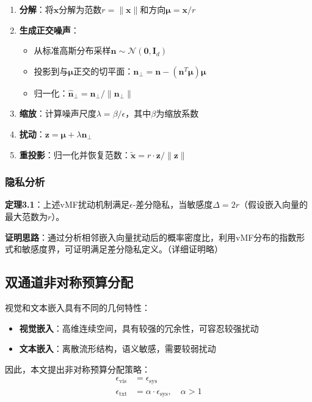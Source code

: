 \documentclass[a4paper,12pt]{article}
\begin{document}
\begin{enumerate}
  \item \textbf{分解}：将$\mathbf{x}$分解为范数$r = \|\mathbf{x}\|$和方向$\boldsymbol{\mu} = \mathbf{x}/r$
  \item \textbf{生成正交噪声}：
  \begin{itemize}
    \item 从标准高斯分布采样$\mathbf{n} \sim \mathcal{N}(\mathbf{0}, \mathbf{I}_d)$
    \item 投影到与$\boldsymbol{\mu}$正交的切平面：$\mathbf{n}_\perp = \mathbf{n} - (\mathbf{n}^T\boldsymbol{\mu})\boldsymbol{\mu}$
    \item 归一化：$\hat{\mathbf{n}}_\perp = \mathbf{n}_\perp / \|\mathbf{n}_\perp\|$
  \end{itemize}
  \item \textbf{缩放}：计算噪声尺度$\lambda = \beta / \epsilon$，其中$\beta$为缩放系数
  \item \textbf{扰动}：$\mathbf{z} = \boldsymbol{\mu} + \lambda \hat{\mathbf{n}}_\perp$
  \item \textbf{重投影}：归一化并恢复范数：$\tilde{\mathbf{x}} = r \cdot \mathbf{z} / \|\mathbf{z}\|$
\end{enumerate}

\subsubsection{隐私分析}

\textbf{定理3.1}：上述vMF扰动机制满足$\epsilon$-差分隐私，当敏感度$\Delta = 2r$（假设嵌入向量的最大范数为$r$）。

\textbf{证明思路}：通过分析相邻嵌入向量扰动后的概率密度比，利用vMF分布的指数形式和敏感度界，可证明满足差分隐私定义。（详细证明略）

\subsection{双通道非对称预算分配}

视觉和文本嵌入具有不同的几何特性：
\begin{itemize}
  \item \textbf{视觉嵌入}：高维连续空间，具有较强的冗余性，可容忍较强扰动
  \item \textbf{文本嵌入}：离散流形结构，语义敏感，需要较弱扰动
\end{itemize}

因此，本文提出非对称预算分配策略：
\begin{align}
\epsilon_{\text{vis}} &= \epsilon_{\text{sys}} \\
\epsilon_{\text{txt}} &= \alpha \cdot \epsilon_{\text{sys}}, \quad \alpha > 1
\end{align}
\end{document}
